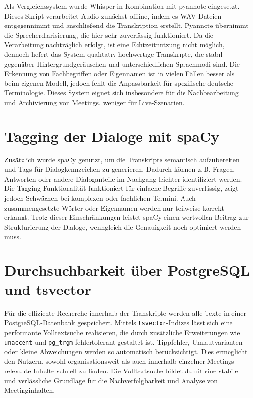 Als Vergleichssystem wurde Whisper in Kombination mit pyannote eingesetzt. 
Dieses Skript verarbeitet Audio zunächst offline, indem es WAV-Dateien entgegennimmt 
und anschließend die Transkription erstellt. Pyannote übernimmt die Sprecherdiarisierung,
die hier sehr zuverlässig funktioniert. Da die Verarbeitung nachträglich erfolgt, ist 
eine Echtzeitnutzung nicht möglich, dennoch liefert das System qualitativ hochwertige 
Transkripte, die stabil gegenüber Hintergrundgeräuschen und unterschiedlichen Sprachmodi 
sind. Die Erkennung von Fachbegriffen oder Eigennamen ist in vielen Fällen besser als 
beim eigenen Modell, jedoch fehlt die Anpassbarkeit für spezifische deutsche Terminologie. 
Dieses System eignet sich insbesondere für die Nachbearbeitung und Archivierung von 
Meetings, weniger für Live-Szenarien.

\section{Tagging der Dialoge mit spaCy}

Zusätzlich wurde spaCy genutzt, um die Transkripte semantisch aufzubereiten und 
Tags für Dialogkennzeichen zu generieren. Dadurch können z.\,B. Fragen, Antworten 
oder andere Dialoganteile im Nachgang leichter identifiziert werden. Die Tagging-Funktionalität
funktioniert für einfache Begriffe zuverlässig, zeigt jedoch Schwächen bei komplexen
oder fachlichen Termini. Auch zusammengesetzte Wörter oder Eigennamen werden nur
teilweise korrekt erkannt. Trotz dieser Einschränkungen leistet spaCy einen wertvollen 
Beitrag zur Strukturierung der Dialoge, wenngleich die Genauigkeit noch optimiert werden 
muss.

\section{Durchsuchbarkeit über PostgreSQL und tsvector}

Für die effiziente Recherche innerhalb der Transkripte werden alle Texte in einer 
PostgreSQL-Datenbank gespeichert. Mittels \texttt{tsvector}-Indizes lässt sich eine 
performante Volltextsuche realisieren, die durch zusätzliche Erweiterungen wie 
\texttt{unaccent} und \texttt{pg\_trgm} fehlertolerant gestaltet ist. Tippfehler, 
Umlautvarianten oder kleine Abweichungen werden so automatisch berücksichtigt. 
Dies ermöglicht den Nutzern, sowohl organisationsweit als auch innerhalb einzelner 
Meetings relevante Inhalte schnell zu finden. Die Volltextsuche bildet damit eine 
stabile und verlässliche Grundlage für die Nachverfolgbarkeit und Analyse von 
Meetinginhalten.

